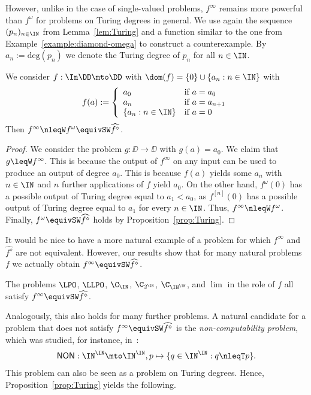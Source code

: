 \documentclass{lmcs}
\def\NON{\mathsf{NON}}
\def\deg{\mathrm{deg}}
\begin{document}
\noindent
However, unlike in the case of single-valued problems, $f^\infty$ remains more powerful
than $f^\omega$ for problems on Turing degrees in general.
We use again the sequence $(p_n)_{n\in\IN}$ from Lemma~\ref{lem:Turing} and a function similar to the
one from Example~\ref{example:diamond-omega} to construct a counterexample.
By $a_n:=\deg(p_n)$ we denote the Turing degree of $p_n$ for all $n\in\IN$.

\begin{exa}
\label{example:infty-omega}
We consider $f:\In\DD\mto\DD$
with $\dom(f)=\{0\}\cup\{a_n:n\in\IN\}$ with
\[f(a):=\left\{\begin{array}{ll}
a_0 & \mbox{if $a=a_0$}\\
a_n & \mbox{if $a=a_{n+1}$}\\
\{a_n:n\in\IN\} & \mbox{if $a=0$}
\end{array}\right.\]
Then $f^\infty\nleqW f^\omega\equivSW\widehat{f^\diamond}$.
\end{exa}
\begin{proof}
We consider the problem $g:\DD\to\DD$ with $g(a)=a_0$. We claim that $g\leqW f^\infty$.
This is because the output of $f^\infty$ on any input can be used to produce an output of 
degree $a_0$.
This is because $f(a)$ yields some $a_n$ with $n\in\IN$ and $n$ further applications of $f$ yield $a_0$.
On the other hand, $f^\omega(0)$ has
a possible output of Turing degree equal to $a_1<a_0$, as $f^{[n]}(0)$ has a possible output
of Turing degree equal to $a_{1}$ for every $n\in\IN$. 
Thus, $f^\infty\nleqW f^\omega$. Finally, $f^\omega\equivSW\widehat{f^\diamond}$ holds by Proposition~\ref{prop:Turing}.
\end{proof}

\noindent
It would be nice to have a more natural example of a problem for which $f^\infty$ and $\widehat{f^\diamond}$
are not equivalent. However, our results show that for many natural problems $f$ we actually obtain 
$f^\infty\equivSW\widehat{f^\diamond}$.

\begin{cor}
The problems $\LPO$, $\LLPO$, $\C_\IN$, $\C_{2^\IN}$, $\C_{\IN^\IN}$, and $\lim$
in the role of $f$ all satisfy $f^\infty\equivSW\widehat{f^\diamond}$.
 \end{cor}

\noindent
Analogously, this also holds for many further problems.
A natural candidate for a problem that does not satisfy $f^\infty\equivSW\widehat{f^\diamond}$
is the {\em non-computability problem}, which was studied,
for instance, in~\cite{BHK17a,Bra23}:
\[\NON:\IN^\IN\mto\IN^\IN,p\mapsto\{q\in\IN^\IN:q\nleqT p\}.\]
This problem can also be seen as a problem on Turing degrees.
Hence, Proposition~\ref{prop:Turing} yields the following.
\end{document}
